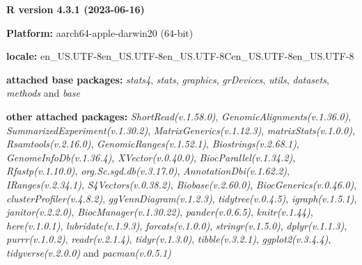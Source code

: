 \documentclass[
]{book}
\begin{document}
\textbf{R version 4.3.1 (2023-06-16)}

\textbf{Platform:} aarch64-apple-darwin20 (64-bit)

\textbf{locale:}
en\_US.UTF-8\textbar\textbar en\_US.UTF-8\textbar\textbar en\_US.UTF-8\textbar\textbar C\textbar\textbar en\_US.UTF-8\textbar\textbar en\_US.UTF-8

\textbf{attached base packages:}
\emph{stats4}, \emph{stats}, \emph{graphics}, \emph{grDevices}, \emph{utils}, \emph{datasets}, \emph{methods} and \emph{base}

\textbf{other attached packages:}
\emph{ShortRead(v.1.58.0)}, \emph{GenomicAlignments(v.1.36.0)}, \emph{SummarizedExperiment(v.1.30.2)}, \emph{MatrixGenerics(v.1.12.3)}, \emph{matrixStats(v.1.0.0)}, \emph{Rsamtools(v.2.16.0)}, \emph{GenomicRanges(v.1.52.1)}, \emph{Biostrings(v.2.68.1)}, \emph{GenomeInfoDb(v.1.36.4)}, \emph{XVector(v.0.40.0)}, \emph{BiocParallel(v.1.34.2)}, \emph{Rfastp(v.1.10.0)}, \emph{org.Sc.sgd.db(v.3.17.0)}, \emph{AnnotationDbi(v.1.62.2)}, \emph{IRanges(v.2.34.1)}, \emph{S4Vectors(v.0.38.2)}, \emph{Biobase(v.2.60.0)}, \emph{BiocGenerics(v.0.46.0)}, \emph{clusterProfiler(v.4.8.2)}, \emph{ggVennDiagram(v.1.2.3)}, \emph{tidytree(v.0.4.5)}, \emph{igraph(v.1.5.1)}, \emph{janitor(v.2.2.0)}, \emph{BiocManager(v.1.30.22)}, \emph{pander(v.0.6.5)}, \emph{knitr(v.1.44)}, \emph{here(v.1.0.1)}, \emph{lubridate(v.1.9.3)}, \emph{forcats(v.1.0.0)}, \emph{stringr(v.1.5.0)}, \emph{dplyr(v.1.1.3)}, \emph{purrr(v.1.0.2)}, \emph{readr(v.2.1.4)}, \emph{tidyr(v.1.3.0)}, \emph{tibble(v.3.2.1)}, \emph{ggplot2(v.3.4.4)}, \emph{tidyverse(v.2.0.0)} and \emph{pacman(v.0.5.1)}
\end{document}

